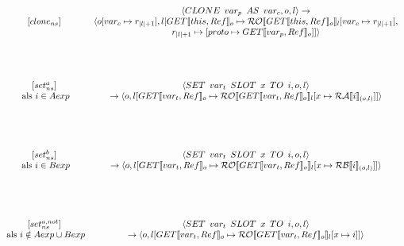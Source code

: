 \documentclass[12pt]{article}
\newcommand{\RA}{\mathcal{RA}}
\newcommand{\RB}{\mathcal{RB}}
\newcommand{\RO}{\mathcal{RO}}
\begin{document}
\[
\begin{matrix}

[clone_{ns}] &
\begin{matrix}
\langle CLONE \enspace var_p \enspace AS \enspace var_c, o, l\rangle 
\rightarrow\\
\langle o[var_c \mapsto r_{|l|+1}], l[GET \llbracket this, Ref \rrbracket_o \mapsto \RO \llbracket GET \llbracket this, Ref \rrbracket_o \rrbracket_l[var_c \mapsto r_{|l|+1}] ,\\ r_{|l|+1} \mapsto [ proto \mapsto GET \llbracket var_p, Ref \rrbracket_o]]\rangle
\end{matrix}\\[60pt]
\begin{matrix}
[set_{ns}^{a}]\\
\mbox{ als } i \in Aexp\\
\end{matrix} &
\begin{matrix}
\langle SET \enspace var_t \enspace SLOT \enspace x \enspace TO \enspace i, o, l \rangle\\
\rightarrow
\langle o, l[GET \llbracket var_t, Ref \rrbracket_o \mapsto \RO \llbracket GET \llbracket var_t, Ref \rrbracket_o \rrbracket_l[x \mapsto \RA 
\llbracket i \rrbracket_{(o,l)}]] \rangle
\end{matrix}\\[60pt]
\begin{matrix}
[set_{ns}^{b}]\\
\mbox{ als } i \in Bexp\\
\end{matrix} &
\begin{matrix}
\langle SET \enspace var_t \enspace SLOT \enspace x \enspace TO \enspace i, o, l \rangle\\
\rightarrow
\langle o, l[GET \llbracket var_t, Ref \rrbracket_o \mapsto \RO \llbracket GET \llbracket var_t, Ref \rrbracket_o \rrbracket_l[x \mapsto \RB 
\llbracket i \rrbracket_{(o,l)}]] \rangle
\end{matrix}\\[60pt]
\begin{matrix}
[set_{ns}^{a,not}]\\
\mbox{ als } i \notin Aexp \cup Bexp\\
\end{matrix} &
\begin{matrix}
\langle SET \enspace var_t \enspace SLOT \enspace x \enspace TO \enspace i, o, l \rangle\\
\rightarrow
\langle o, l[GET \llbracket var_t, Ref \rrbracket_o \mapsto \RO \llbracket GET \llbracket var_t, Ref \rrbracket_o \rrbracket_l[x \mapsto i ]] \rangle
\end{matrix}\\
\end{matrix}\\
\]
\end{document}
